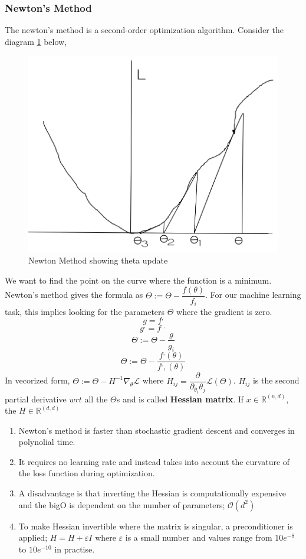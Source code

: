 \documentclass[12pt,a4paper,titlepage,portrait,openany]{book}
\begin{document}
	\subsubsection{Newton's Method}
	The newton's method is a second-order optimization algorithm.
	Consider the diagram \ref{fig:loss-landscape} below,  
	
	\begin{figure}
		\centering
		\includegraphics[width=0.7\linewidth, height=0.3\textheight]{loss-landscape}
		\caption{Newton Method showing theta update}
		\label{fig:loss-landscape}
	\end{figure}
	
	
	We want to find the point on the curve where the function is a minimum. Newton's method gives the formula as $\Theta := \Theta - \dfrac{f(\theta)}{f_i}$. For our machine learning task, this implies looking for the parameters $\Theta$ where the gradient is zero. 
	$$g = f^,$$ $$g^, = f^{,,}$$
	$$\Theta := \Theta - \dfrac{g}{g_i}$$
	$$\Theta := \Theta - \dfrac{f^,(\theta)}{f^,,(\theta)}$$
	In vecorized form, $\Theta := \Theta - H^{-1}\nabla_\theta\mathcal{L}$ where $H_{ij} = \dfrac{\partial}{\partial_{\theta_i}\theta_j}\mathcal{L}(\Theta)$. $H_{ij}$ is the second partial derivative $wrt$ all the $\Theta$s and is called \textbf{Hessian matrix}. If $x \in \mathbb{R}^{(n, d)}$, the $H \in \mathbb{R}^{(d, d)} $ \\
	
	\begin{enumerate}
		\item Newton's method is faster than stochastic gradient descent and converges in polynolial time.
		\item It requires no learning rate and instead takes into account the curvature of the loss function during optimization.
		\item A disadvantage is that inverting the Hessian is computationally expensive and the bigO is dependent on the number of parameters; $\mathcal{O}(d^2)$ 
		\item To make Hessian invertible where the matrix is singular, a preconditioner is applied; $H = H + \varepsilon{I}$ where $\varepsilon$ is a small number and values range from $10e^{-8}$ to $10e^{-10}$ in practise.
	
	\end{enumerate}
\end{document}
